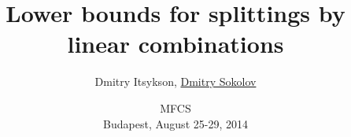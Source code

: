 

\title[\insertframenumber/\inserttotalframenumber~|~
Lower bounds for splittings by linear combinations]
{Lower bounds for splittings by linear combinations}
\author[Sokolov D.O]{Dmitry Itsykson, \underline{Dmitry Sokolov}}

\date{MFCS\\
	Budapest, August 25-29, 2014}



	\maketitle

	




